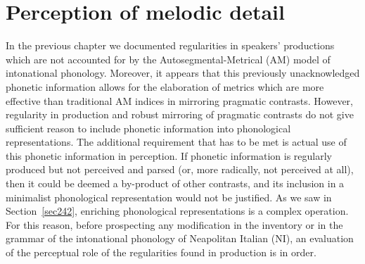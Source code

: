 \chapter[Perception of melodic detail]{Perception of melodic detail}\label{sec3}
In the previous chapter we documented regularities in speakers' productions which are not accounted for by the Autosegmental-Metrical (AM) model of intonational phonology. Moreover, it appears that this previously unacknowledged phonetic information allows for the elaboration of metrics which are more effective than traditional AM indices in mirroring pragmatic contrasts. However, regularity in production and robust mirroring of pragmatic contrasts do not give sufficient reason to include phonetic information into phonological representations. The additional requirement that has to be met is actual use of this phonetic information in perception. If phonetic information is regularly produced but not perceived and parsed (or, more radically, not perceived at all), then it could be deemed a by-product of other contrasts, and its inclusion in a minimalist phonological representation would not be justified. As we saw in  Section~\ref{sec242}, enriching phonological representations is a complex operation. For this reason, before prospecting any modification in the inventory or in the grammar of the intonational phonology of Neapolitan Italian (NI), an evaluation of the perceptual role of the regularities found in production is in order.

